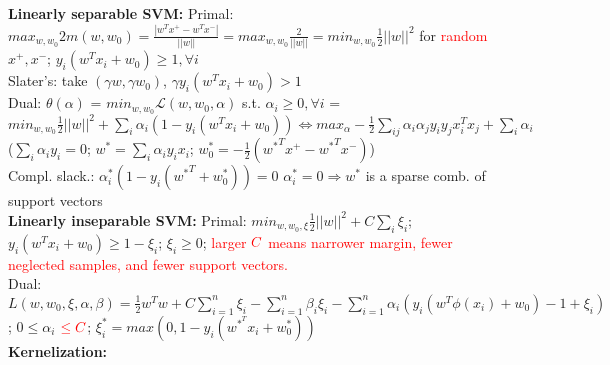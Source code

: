 \textbf{Linearly separable SVM: } 
Primal: $max_{w, w_{0}} 2m(w, w_{0}) = \frac{|w^{T}x^{+} - w^{T}x^{-}|}{||w||} = max_{w, w_0} \frac{2}{||w||} = min_{w, w_0} \frac{1}{2}||w||^2$ for \textcolor{red}{random} $x^{+}, x^{-}$; $y_i(w^{T}x_{i}+w_{0}) \geq 1, \forall i$
\\
Slater's: take $(\gamma w, \gamma w_0)$, $\gamma y_i(w^{T}x_{i} + w_{0}) > 1$
\\
Dual: $\theta(\alpha)$ = $min_{w, w_0}\mathcal{L}(w, w_0, \alpha)$ s.t. $\alpha_i \geq 0, \forall i$ = $min_{w, w_0}\frac{1}{2}||w||^2 + \sum_{i}\alpha_i(1 - y_i(w^T x_i + w_0)) \Leftrightarrow max_{\alpha}-\frac{1}{2}\sum_{ij}\alpha_i \alpha_j y_i y_j x_{i}^{T}x_{j} + \sum_{i}\alpha_i$ ($\sum_{i}\alpha_i y_i = 0$; $w^{*} = \sum_{i}\alpha_i y_i x_i$; $w_{0}^{*} = -\frac{1}{2}({w^{*}}^{T}x^{+} - {w^{*}}^{T}x^{-})$)
\\
Compl. slack.: $\alpha_i^{*}(1 - y_i({w^{*}}^{T} + w_{0}^{*})) = 0$ \Rightarrow $\alpha_{i}^{*} = 0  \Rightarrow w^{*}$ is a sparse comb. of support vectors \\
\textbf{Linearly inseparable SVM: } 
Primal: $min_{w, w_0, \xi} \frac{1}{2}||w||^2+C\sum_{i}\xi_{i}$; $y_i(w^{T}x_{i}+w_{0}) \geq 1 - \xi_{i}$; $\xi_{i} \geq 0$; \textcolor{red}{larger} $\color{red}{C}$ \textcolor{red}{means narrower margin, fewer neglected samples, and fewer support vectors.}
\\
Dual: 
$L(w,w_0,\xi,\alpha,\beta)=\frac{1}{2}w^Tw + C\sum_{i=1}^n\xi_i - \sum_{i=1}^{n}\beta_i\xi_i -\sum_{i=1}^{n} \alpha_i(y_i(w^T\phi(x_i) + w_0) -1+\xi_i)$; $0 \leq \alpha_i$ $\color{red}{\leq C}$; $\xi_{i}^{*} = max(0, 1 - y_i({w^{*}^{T} x_i + w_{0}^{*}}))$
\\
\textbf{Kernelization: } 
